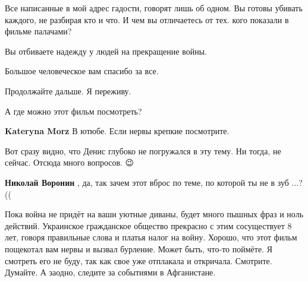 \begin{itemize}
\begin{itemize}
Все написанные в мой адрес гадости, говорят лишь об одном. Вы готовы убивать
каждого, не разбирая кто и что. И чем вы отличаетесь от тех. кого показали в
фильме палачами?

Вы отбиваете надежду у людей на прекращение войны.

Большое человеческое вам спасибо за все.

Продолжайте дальше. Я переживу.

\end{itemize}

 
А где можно этот фильм посмотреть?


\begin{itemize}

 
\textbf{Kateryna Morz} В ютюбе. Если нервы крепкие посмотрите.
\end{itemize}

\par
 
Вот сразу видно, что Денис глубоко не погружался в эту тему. Ни тогда, не сейчас. Отсюда много вопросов. 😉

\begin{itemize}
 
\textbf{Николай Воронин} , да, так зачем этот вброс по теме, по которой ты не в зуб ...?((
\end{itemize}

 
Пока война не придёт на ваши уютные диваны, будет много пышных фраз и ноль
действий. Украинское гражданское общество прекрасно с этим сосуществует 8 лет,
говоря правильные слова и платья налог на войну. Хорошо, что этот фильм
пощекотал вам нервы и вызвал бурление. Может быть, что-то поймёте. Я смотреть
его не буду, так как свое уже отплакала и откричала. Смотрите. Думайте. А
заодно, следите за событиями в Афганистане.


\end{itemize}

